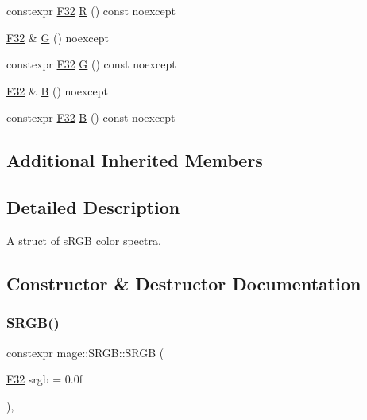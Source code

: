 \begin{DoxyCompactItemize}
\item 
constexpr \mbox{\hyperlink{namespacemage_aa97e833b45f06d60a0a9c4fc22ae02c0}{F32}} \mbox{\hyperlink{structmage_1_1_s_r_g_b_a3832f4baad888be7c26eb18ab22e4aae}{R}} () const noexcept
\item 
\mbox{\hyperlink{namespacemage_aa97e833b45f06d60a0a9c4fc22ae02c0}{F32}} \& \mbox{\hyperlink{structmage_1_1_s_r_g_b_a88494ac4bba90f80a5ec62690292f005}{G}} () noexcept
\item 
constexpr \mbox{\hyperlink{namespacemage_aa97e833b45f06d60a0a9c4fc22ae02c0}{F32}} \mbox{\hyperlink{structmage_1_1_s_r_g_b_a4d5f1ba05db3b00d17525bc9fcbf1352}{G}} () const noexcept
\item 
\mbox{\hyperlink{namespacemage_aa97e833b45f06d60a0a9c4fc22ae02c0}{F32}} \& \mbox{\hyperlink{structmage_1_1_s_r_g_b_ab6b1ec933517eb2b9fe2e5fb488d8ab8}{B}} () noexcept
\item 
constexpr \mbox{\hyperlink{namespacemage_aa97e833b45f06d60a0a9c4fc22ae02c0}{F32}} \mbox{\hyperlink{structmage_1_1_s_r_g_b_adaeb952d093a477e435da495779c4e61}{B}} () const noexcept
\end{DoxyCompactItemize}
\subsection*{Additional Inherited Members}


\subsection{Detailed Description}
A struct of s\+R\+GB color spectra. 

\subsection{Constructor \& Destructor Documentation}
\mbox{\label{structmage_1_1_s_r_g_b_a5f1cc4d90aaa3801f1146eb767d45476}} 
\subsubsection{\texorpdfstring{S\+R\+G\+B()}{SRGB()}\hspace{0.1cm}{\footnotesize\ttfamily [1/6]}}
{\footnotesize\ttfamily constexpr mage\+::\+S\+R\+G\+B\+::\+S\+R\+GB (\begin{DoxyParamCaption}\item[{\mbox{\hyperlink{namespacemage_aa97e833b45f06d60a0a9c4fc22ae02c0}{F32}}}]{srgb = {\ttfamily 0.0f} }\end{DoxyParamCaption})\hspace{0.3cm}{\ttfamily [explicit]}, {\ttfamily [noexcept]}}

